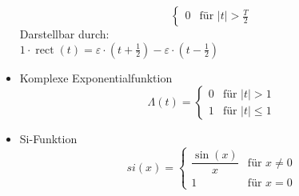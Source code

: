 \begin{mdframed}[style=exercise]
\begin{itemize}[leftmargin=*]
\[\begin{cases}
                 0 & \text{f\"ur } \vert t\rvert > \frac{T}{2}
             \end{cases}
          \]
          Darstellbar durch:\\ $1\cdot  \operatorname{rect}(t) = \varepsilon\cdot\left( t+\frac{1}{2} \right)-\varepsilon\cdot\left( t-\frac{1}{2} \right)$
          \item{Komplexe Exponentialfunktion}
          \[ \Lambda(t) =
             \begin{cases}
                 0 & \text{f\"ur } \vert t\rvert > 1\\
                 1 & \text{f\"ur } \vert t\rvert \leq 1
             \end{cases}
          \]
          \item Si-Funktion
                    \[ si(x) =
          \begin{cases}
          	\dfrac{\sin(x)}{x} & \text{f\"ur } x\neq 0\\
          	1 & \text{f\"ur } x = 0
          \end{cases}
          \]
      \end{itemize}
  \end{mdframed}
